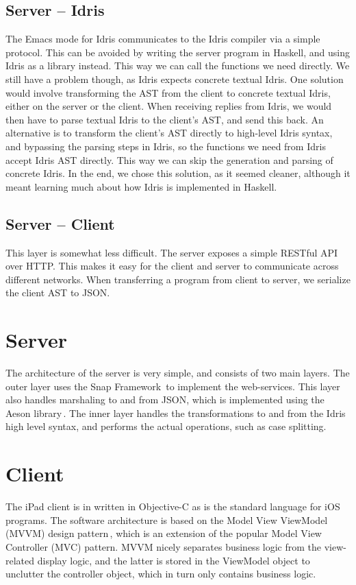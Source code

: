\subsection{Server -- Idris}
The Emacs mode for Idris communicates to the Idris compiler via a simple protocol. This can be avoided by writing the server program in
Haskell, and using Idris as a library instead. This way we can call the
functions we need directly. We still have a problem though, as Idris expects
concrete textual Idris. One solution would involve transforming the AST from 
the client to concrete textual Idris, either on the server or the client. When
receiving replies from Idris, we would then have to parse textual Idris to the
client's AST\@, and send this back. An alternative is to transform the 
client's AST directly to high-level Idris syntax, and bypassing the parsing
steps in Idris, so the functions we need from Idris accept Idris AST directly.
This way we can skip the generation and parsing of concrete Idris. In the end,
we chose this solution, as it seemed cleaner, although it meant learning much
about how Idris is implemented in Haskell.

\subsection{Server -- Client}
This layer is somewhat less difficult. The server exposes a simple RESTful API 
over HTTP\@. This makes it easy for the client and server to communicate across
different networks. When transferring a program from client to server, we
serialize the client AST to JSON\@.

\section{Server}
\label{sec:Server}
The architecture of the server is very simple, and consists of two main 
layers. The outer layer uses the Snap Framework\,\cite{snap_framework} to implement the 
web-services. This layer also handles marshaling to and from JSON\@, which is 
implemented using the Aeson library\,\cite{aeson_package}. The inner layer handles the 
transformations to and from the Idris high level syntax, and performs the 
actual operations, such as case splitting.

\section{Client}
The iPad client is in written in Objective-C as is the standard language for iOS programs. The
software architecture is based on the Model View ViewModel (MVVM) design 
pattern\,\cite{JohnGossman:MVVM}, which is an extension of the popular Model View Controller 
(MVC) pattern. MVVM nicely separates business logic from the view-related
display logic, and the latter is stored in the ViewModel object to unclutter 
the controller object, which in turn only contains business logic.

